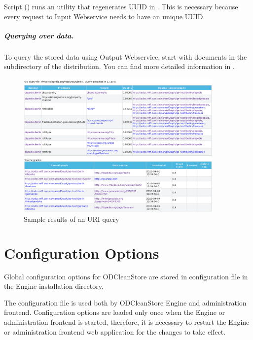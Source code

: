    Script  () runs an utility that regenerates UUID in
   . This is necessary because every request
   to Input Webservice needs to have an unique UUID.

\paragraph{Querying over data.} To query the stored data using Output Webservice, start with  documents in 
  the  subdirectory of the distribution. You can find more detailed information in .

\begin{figure}[hb]
    \centering
    \includegraphics[width=0.9\textwidth]{images/uri-query-screenshot.png}
    \caption{Sample results of an URI query}
    \label{fig:uriQuery}
\end{figure}

\chapter{Configuration Options}
 \label{chap:configOptions}
Global configuration options for ODCleanStore are stored in configuration file  in the Engine installation directory.

The configuration file is used both by ODCleanStore Engine and administration frontend. Configuration options are loaded only once when the Engine or administration frontend is started, therefore, it is necessary to restart the Engine or administration frontend web application for the changes to take effect.

